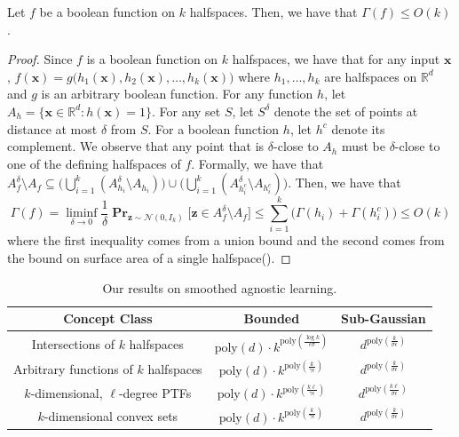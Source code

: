 \documentclass{theoretics}
\renewcommand\vec[1]{\mathbf{#1}}
\DeclareMathOperator*{\pr}{\mathbf{Pr}}
\newcommand{\R}{\mathbb{R}}
\newcommand{\poly}{\mathrm{poly}}
\newcommand{\1}{\Ind}
\newcommand{\x}{\vec x}
\newcommand{\z}{\vec z}
\newcommand{\Gauss}{\mathcal{N}}
\begin{document}
 
\begin{lemma}
\label{claim:gsa_func}
    Let $f$ be a boolean function on $k$ halfspaces. Then, we have that $\Gamma(f)\leq O(k)$.
\end{lemma}
\begin{proof}
    Since $f$ is a boolean function on $k$ halfspaces, we have that for any input $\x$, $f(\x)=g\bigl(h_1(\x),h_2(\x),\ldots,h_k(\x)\bigr)$ where $h_1,\ldots,h_k$ are halfspaces on $\R^d$ and $g$ is an arbitrary boolean function. For any function $h$, let $A_h = \{\x\in\R^d: h(\x)=1\}$. For any set $S$, let $S^{\delta}$ denote the set of points at distance at most $\delta$ from $S$. For a boolean function $h$, let $h^c$ denote its complement.
    We observe that any point that is $\delta$-close to $A_h$ must be $\delta$-close to one of the defining halfspaces of $f$. Formally, we have that  $A_f^{\delta}\setminus A_f\subseteq \bigl(\bigcup_{i=1}^{k}(A_{h_i}^\delta\setminus A_{h_i})\bigr)\cup \bigl(\bigcup_{i=1}^{k}(A_{{h_i^c}}^\delta\setminus A_{h_i^c})\bigr)$. Then, we have that \[\Gamma(f) = \liminf_{\delta \to 0} \frac{1}{\delta} \pr_{\z\sim\Gauss(0,I_k)}\bigr[\z \in A_f^\delta \setminus A_f\bigr]\leq \sum_{i=1}^{k}\bigl(\Gamma(h_i)+\Gamma(h_i^c)\bigr)\leq O(k)\]
    where the first inequality comes from a union bound and the second comes from the bound on surface area of a single halfspace(). 
\end{proof}


\begin{table}[ht]
\centering
\begin{tabular}{|c|c|c|}
\hline
Concept Class & Bounded & Sub-Gaussian \\ 
\hline
\hline
Intersections  of $k$ halfspaces  & $\poly(d) \cdot k^{\poly(\frac{\log k}{\epsilon\sigma})}$ 
& $ d^{\poly(\frac{k}{\sigma \epsilon})} $
\\ 
\hline
Arbitrary functions of $k$ halfspaces & $\poly(d)\cdot k^{\poly(\frac{k}{\gamma\epsilon})}$ & 
$d^{\poly(\frac{k}{\sigma\epsilon})}$  \\

\hline
$k$-dimensional, $\ell$-degree PTFs  & $\poly(d)\cdot k^{\poly(\frac{k \ell}{\gamma\epsilon} ) }$ &  
$d^{\poly(\frac{k \ell}{\sigma\epsilon})}$  \\
\hline

$k$-dimensional convex sets  & $\poly(d)\cdot k^{\poly(\frac{k}{\gamma\epsilon} ) }$ &  
$d^{\poly(\frac{k}{\sigma\epsilon})}$  \\

\hline
\end{tabular}
\caption{Our results on smoothed agnostic learning.}
\label{tab:smoothed}
\end{table}
\end{document}
